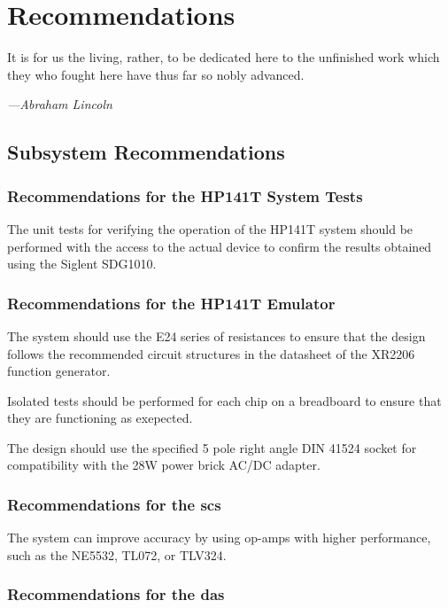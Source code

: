 \documentclass[class=report,11pt,crop=false]{standalone}
\begin{document}
\chapter{Recommendations \label{ch:recommendations}}
\epigraph{It is for us the living, rather, to be dedicated here to the unfinished work which they who fought here have thus far so nobly advanced.}%
    {\emph{---Abraham Lincoln}}
\vspace{0.5cm}
\section{Subsystem Recommendations}

\subsection{Recommendations for the HP141T System Tests}

The unit tests for verifying the operation of the HP141T system should be performed with the access to the actual device to confirm the results obtained using the Siglent SDG1010.

\subsection{Recommendations for the HP141T Emulator}

The system should use the E24 series of resistances to ensure that the design follows the recommended circuit structures in the datasheet of the XR2206 function generator.

Isolated tests should be performed for each chip on a breadboard to ensure that they are functioning as exepected. 

The design should use the specified 5 pole right angle DIN 41524 socket for compatibility with the 28W power brick AC/DC adapter. 

\subsection{Recommendations for the \acrlong{scs}}

The system can improve accuracy by using op-amps with higher performance, such as the NE5532, TL072, or TLV324. 

\subsection{Recommendations for the \acrlong{das}}
\end{document}
